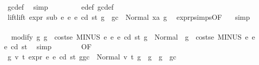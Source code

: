 \begin{isabellebody}
\ gc{\isacharunderscore}{\kern0pt}def\ \isamarkupfalse%
\ simp\isanewline
\ \ \ \ \ \ \isamarkupfalse%
\ {}{}{\isacharparenleft}{\kern0pt}{}{\isacharparenright}{\kern0pt}\ e{\isacharunderscore}{\kern0pt}def\ gc{\isacharunderscore}{\kern0pt}def\ \isamarkupfalse%
\ lift{\isacharcolon}{\kern0pt}{\isachardoublequoteopen}lift\ expr\ sub\ e{}\ e{}\ e\ cd\ st\ {\isacharparenleft}{\kern0pt}g\ {\isacharminus}{\kern0pt}\ gc{\isacharparenright}{\kern0pt}\ {\isacharequal}{\kern0pt}\ Normal\ {\isacharparenleft}{\kern0pt}xa{\isacharcomma}{\kern0pt}\ g{}{\isacharparenright}{\kern0pt}{\isachardoublequoteclose}\ \isamarkupfalse%
\ expr{\isachardot}{\kern0pt}psimps{\isacharparenleft}{\kern0pt}{}{}{\isacharparenright}{\kern0pt}{\isacharbrackleft}{\kern0pt}OF\ {}{}{\isacharparenleft}{\kern0pt}{}{\isacharparenright}{\kern0pt}{\isacharbrackright}{\kern0pt}\ \isamarkupfalse%
\ simp\isanewline
\ \ \ \ \ \ \isamarkupfalse%
\ \isamarkupfalse%
\ {\isacharasterisk}{\kern0pt}{\isacharasterisk}{\kern0pt}{\isacharcolon}{\kern0pt}\ {\isachardoublequoteopen}modify\ {\isacharparenleft}{\kern0pt}{\isasymlambda}g{\isachardot}{\kern0pt}\ g\ {\isacharminus}{\kern0pt}\ costs\isactrlsub e\ {\isacharparenleft}{\kern0pt}MINUS\ e{}\ e{}{\isacharparenright}{\kern0pt}\ e\ cd\ st{\isacharparenright}{\kern0pt}\ g\ {\isacharequal}{\kern0pt}\ Normal\ {\isacharparenleft}{\kern0pt}{\isacharparenleft}{\kern0pt}{\isacharparenright}{\kern0pt}{\isacharcomma}{\kern0pt}\ g\ {\isacharminus}{\kern0pt}\ costs\isactrlsub e\ {\isacharparenleft}{\kern0pt}MINUS\ e{}\ e{}{\isacharparenright}{\kern0pt}\ e\ cd\ st{\isacharparenright}{\kern0pt}{\isachardoublequoteclose}\ \isamarkupfalse%
\ simp\isanewline
\ \ \ \ \ \ \isamarkupfalse%
\ {}{}{\isacharparenleft}{\kern0pt}{}{\isacharparenright}{\kern0pt}{\isacharbrackleft}{\kern0pt}OF\ {\isacharasterisk}{\kern0pt}\ {\isacharasterisk}{\kern0pt}{\isacharasterisk}{\kern0pt}{\isacharbrackright}{\kern0pt}\ \isamarkupfalse%
\ {\isachardoublequoteopen}{\isasymAnd}g{}{\isacharprime}{\kern0pt}\ v{}\ t{}{\isachardot}{\kern0pt}\ expr\ e{}\ e\ cd\ st\ {\isacharparenleft}{\kern0pt}g{\isacharminus}{\kern0pt}gc{\isacharparenright}{\kern0pt}\ {\isacharequal}{\kern0pt}\ Normal\ {\isacharparenleft}{\kern0pt}{\isacharparenleft}{\kern0pt}v{}{\isacharcomma}{\kern0pt}\ t{}{\isacharparenright}{\kern0pt}{\isacharcomma}{\kern0pt}\ g{}{\isacharprime}{\kern0pt}{\isacharparenright}{\kern0pt}\ {\isasymLongrightarrow}\ g{}{\isacharprime}{\kern0pt}\ {\isasymle}\ g\ {\isacharminus}{\kern0pt}\ gc{\isachardoublequoteclose}\ \isamarkupfalse%

\end{isabellebody}
